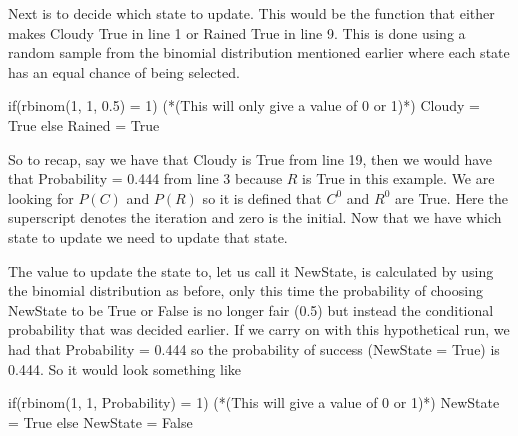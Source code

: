 \documentclass[12pt,twoside]{report}   %
\def\ContinueLineNumber{\lstset{firstnumber=last}}
\begin{document}
Next is to decide which state to update. This would be the function that either makes Cloudy True in line 1 or Rained True in line 9. This is done using a random sample from the binomial distribution mentioned earlier where each state has an equal chance of being selected.
\ContinueLineNumber
\begin{Pseudocode}[caption={This is how we will decide which state to update, either the state Cloudy or the state Rained.},language=R,escapeinside={(*}{*)},label={code2}]
if(rbinom(1, 1, 0.5) = 1){ (*(This will only give a value of 0 or 1)*)
	Cloudy = True
}
else{
	Rained = True
}
\end{Pseudocode}
So to recap, say we have that Cloudy is True from line 19, then we would have that Probability = 0.444 from line 3 because $R$ is True in this example. We are looking for $P(C)$ and $P(R)$ so it is defined that $C^0$ and $R^0$ are True. Here the superscript denotes the iteration and zero is the initial. Now that we have which state to update we need to update that state.

The value to update the state to, let us call it NewState, is calculated by using the binomial distribution as before, only this time the probability of choosing NewState to be True or False is no longer fair (0.5) but instead the conditional probability that was decided earlier. If we carry on with this hypothetical run, we had that Probability = 0.444 so the probability of success (NewState = True) is 0.444. So it would look something like
\ContinueLineNumber
\begin{Pseudocode}[caption={This is how we will decide what to update the chosen state to, where the probability of success is dependent on the value of the variable $\text{Probability}$.},language=R,escapeinside={(*}{*)},label={code3}]
if(rbinom(1, 1, Probability) = 1){ (*(This will give a value of 0 or 1)*)
	NewState = True
}
else{
	NewState = False
}
\end{Pseudocode}
\end{document}
